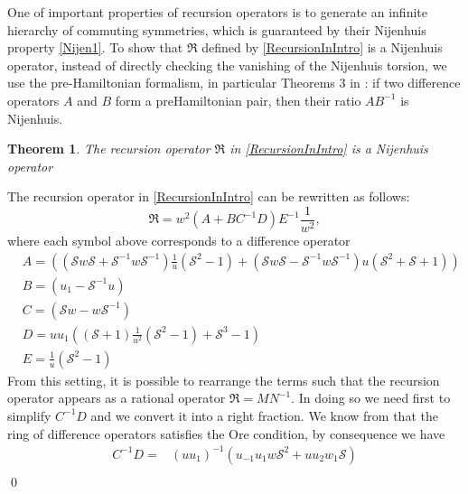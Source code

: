 \documentclass[fleqn,11pt,twoside]{article}
\makeatletter
\newtheorem{theorem}{Theorem}[section]
\renewenvironment{proof}[1][\proofname]{\par
  \normalfont
  \topsep6\p@\@plus6\p@ \trivlist
  \item[\hskip\labelsep\textbf{%
    #1\@addpunct{.}}]\ignorespaces
}{%
  \qed\endtrivlist
}
\theoremstyle{definition}
\makeatother
\begin{document}
One of important properties of recursion operators is to generate an infinite hierarchy of commuting symmetries, which
is guaranteed by their Nijenhuis property \eqref{Nijen1}. To show that $\mathfrak{R}$ defined by \eqref{RecursionInIntro} is a
Nijenhuis operator, instead of directly checking the vanishing of the Nijenhuis torsion,
we use the pre-Hamiltonian formalism, in particular Theorems 3
in \cite{4}: if two difference operators $A$ and $B$ form a preHamiltonian pair, then their ratio $AB^{-1}$ is Nijenhuis.
	\begin{theorem} \label{Theorem1}
		The recursion operator $\mathfrak{R}$ in \eqref{RecursionInIntro} is a
Nijenhuis operator
	\end{theorem}
	\begin{proof}
		The recursion operator in \eqref{RecursionInIntro} can be rewritten as follows:
		\begin{equation}
			\mathfrak{R} = w^2 \left(A + B C^{-1} D\right)
E^{-1}\frac{1}{w^2},
			\label{factorised2}
		\end{equation}
		where each symbol above corresponds to a difference operator
		\begin{equation}
			\begin{split}
				& A = \left(\left(\mathcal{S}w \mathcal{S}
+\mathcal{S}^{-1} w \mathcal{S}^{-1}
\right)\frac{1}{u}\left(\mathcal{S}^2-1\right) +\left( \mathcal{S} w\mathcal{S}
-  \mathcal{S}^{-1}w \mathcal{S}^{-1}\right) u
\left(\mathcal{S}^{2}+\mathcal{S}+1\right)\right)\\
				& B = \left( {u_1}-\mathcal{S}^{-1} u\right) \\
				& C = \left(\mathcal{S}w - w
\mathcal{S}^{-1}\right)\\
				& D =  u u_1\left( \left(  \mathcal{S}+1\right)
\frac{1}{u^2} \left( \mathcal{S}^2-1\right)
+\mathcal{S}^3-1\right)\\
				& E = \frac{1}{u}\left(\mathcal{S}^2-1\right)
			\end{split}
			\label{definition2}
		\end{equation}
		From this setting, it is possible to rearrange the terms such
that the recursion operator appears as a rational operator $\mathfrak{R} = M
N^{-1}$. In doing so we need first to simplify $C^{-1}D$ and we convert it into a right fraction. We know from \cite{4} that the ring of difference operators satisfies the Ore condition, by consequence we have
\begin{equation*}
\begin{split}
C^{-1}D = &  \left({u u_1}\right)^{-1}\left(u_{-1} u_1 w \mathcal{S}^2+u u_2 w_1 \mathcal{S}\right)\\

\end{split}
\end{equation*}
\end{proof}
\end{document}
